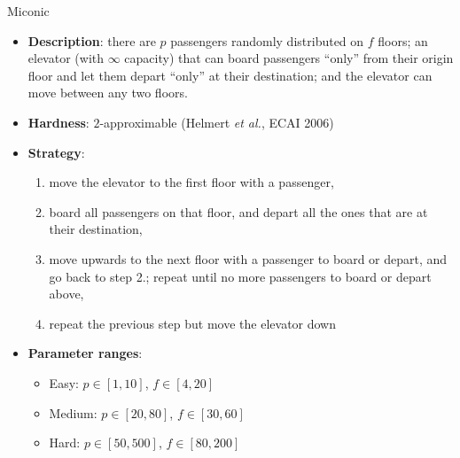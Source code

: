 \documentclass[aspectratio=169,xcolor=dvipsnames]{beamer}
\begin{document}
\begin{frame}{Miconic}

    \begin{itemize}
        \item \textbf{Description}: there are $p$ passengers randomly distributed on $f$ floors; an elevator (with $\infty$ capacity) that can board passengers ``only'' from their origin floor and let them depart ``only'' at their destination; and the elevator can move between any two floors.
        \item \textbf{Hardness}: $2$-approximable (Helmert \textit{et al.}, ECAI 2006)
        \item \textbf{Strategy}:
        \begin{enumerate}
            \item move the elevator to the first floor with a passenger,
            \item board all passengers on that floor, and depart all the ones that are at their destination,
            \item move upwards to the next floor with a passenger to board or depart, and go back to step 2.; repeat until no more passengers to board or depart above,
            \item repeat the previous step but move the elevator down
        \end{enumerate}
        \item \textbf{Parameter ranges}:
        \begin{itemize}
            \item Easy: $p\in[1, 10]$, $f \in [4, 20]$
            \item Medium: $p\in[20, 80]$, $f \in [30, 60]$
            \item Hard: $p\in[50, 500]$, $f \in [80, 200]$
        \end{itemize}
    \end{itemize}

\end{frame}
\end{document}

